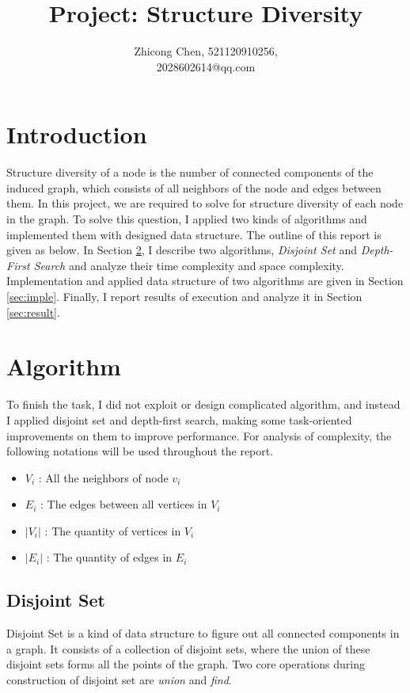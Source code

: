 \documentclass{article}
\title{\textbf{Project: Structure Diversity}}
\author{Zhicong Chen, 521120910256,\\ 2028602614@qq.com }
\begin{document}
	\rmfamily
	\maketitle
	\iffalse
	\begin{abstract}
		Your abstract.
	\end{abstract}
	\fi
	\section{Introduction} \label{sec:intro}
	Structure diversity of a node is the number of connected components of the induced graph, which consists of all neighbors of the node and edges between them. In this project, we are required to solve for structure diversity of each node in the graph. To solve this question, I applied two kinds of algorithms and implemented them with designed data structure. The outline of this report is given as below. In Section \ref{sec:algo}, I describe two algorithms, \textit{Disjoint Set} and \textit{Depth-First Search} and analyze their time complexity and space complexity. Implementation and applied data structure of two algorithms are given in Section \ref{sec:imple}. Finally, I report results of execution and analyze it in Section \ref{sec:result}.
	
	\section{Algorithm} \label{sec:algo}
	To finish the task, I did not exploit or design complicated algorithm, and instead I applied disjoint set and depth-first search, making some task-oriented improvements on them to improve performance. For analysis of complexity, the following notations will be used throughout the report.
	
	\begin{itemize}
		\item $V_i$ : All the neighbors of node $v_i$ 
		\item $E_i$ : The edges between all vertices in $V_i$ 
		\item $|V_i|$ : The quantity of vertices in $V_i$
		\item $|E_i|$ : The quantity of edges in $E_i$
	\end{itemize}
	
	\subsection{Disjoint Set}
	Disjoint Set is a kind of data structure to figure out all connected components in a graph. It consists of a collection of disjoint sets, where the union of these disjoint sets forms all the points of the graph. Two core operations during construction of disjoint set are \textit{union} and \textit{find}. 
	
\end{document}
